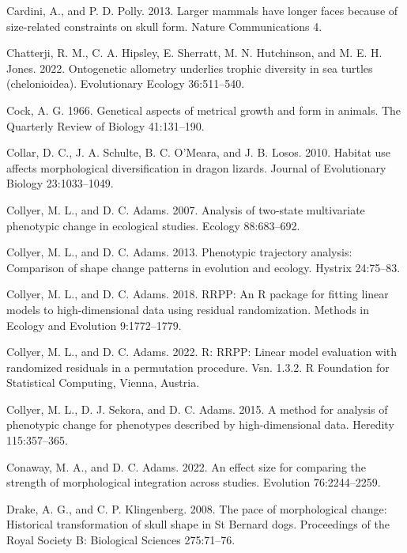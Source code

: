 \documentclass[
  11pt,
]{article}
\begin{document}
\leavevmode\hypertarget{ref-Cardini2013}{}%
Cardini, A., and P. D. Polly. 2013. Larger mammals have longer faces
because of size-related constraints on skull form. Nature Communications
4.

\leavevmode\hypertarget{ref-Chatterji2022}{}%
Chatterji, R. M., C. A. Hipsley, E. Sherratt, M. N. Hutchinson, and M.
E. H. Jones. 2022. Ontogenetic allometry underlies trophic diversity in
sea turtles (chelonioidea). Evolutionary Ecology 36:511--540.

\leavevmode\hypertarget{ref-Cock1966}{}%
Cock, A. G. 1966. Genetical aspects of metrical growth and form in
animals. The Quarterly Review of Biology 41:131--190.

\leavevmode\hypertarget{ref-COLLAR2010}{}%
Collar, D. C., J. A. Schulte, B. C. O'Meara, and J. B. Losos. 2010.
Habitat use affects morphological diversification in dragon lizards.
Journal of Evolutionary Biology 23:1033--1049.

\leavevmode\hypertarget{ref-CollyerAdams2007}{}%
Collyer, M. L., and D. C. Adams. 2007. Analysis of two-state
multivariate phenotypic change in ecological studies. Ecology
88:683--692.

\leavevmode\hypertarget{ref-CollyerAdams2013}{}%
Collyer, M. L., and D. C. Adams. 2013. Phenotypic trajectory analysis:
Comparison of shape change patterns in evolution and ecology. Hystrix
24:75--83.

\leavevmode\hypertarget{ref-CollyerAdams2018}{}%
Collyer, M. L., and D. C. Adams. 2018. RRPP: An R package for fitting
linear models to high-dimensional data using residual randomization.
Methods in Ecology and Evolution 9:1772--1779.

\leavevmode\hypertarget{ref-RRPP}{}%
Collyer, M. L., and D. C. Adams. 2022. R: RRPP: Linear model evaluation
with randomized residuals in a permutation procedure. Vsn. 1.3.2. R
Foundation for Statistical Computing, Vienna, Austria.

\leavevmode\hypertarget{ref-Collyer_et_al2015}{}%
Collyer, M. L., D. J. Sekora, and D. C. Adams. 2015. A method for
analysis of phenotypic change for phenotypes described by
high-dimensional data. Heredity 115:357--365.

\leavevmode\hypertarget{ref-ConawayAdams2022}{}%
Conaway, M. A., and D. C. Adams. 2022. An effect size for comparing the
strength of morphological integration across studies. Evolution
76:2244--2259.

\leavevmode\hypertarget{ref-DrakeKlingenberg2008}{}%
Drake, A. G., and C. P. Klingenberg. 2008. The pace of morphological
change: Historical transformation of skull shape in St Bernard dogs.
Proceedings of the Royal Society B: Biological Sciences 275:71--76.
\end{document}
